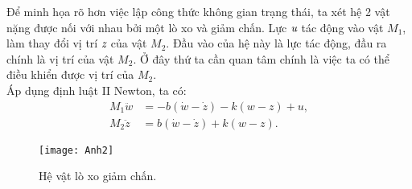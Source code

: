 \begin{example}
Để minh họa rõ hơn việc lập công thức không gian trạng thái, ta xét hệ 2 vật nặng được nối với nhau bởi một lò xo và giảm chấn. Lực $\emph{u}$ tác động vào vật $M_1$, làm thay đổi vị trí $\emph{z}$ của vật $M_2$. Đầu vào của hệ này là lực tác động, đầu ra chính là vị trí của vật $M_2$. Ở đây thứ ta cần quan tâm chính là việc ta có thể điều khiển được vị trí của $M_2$.\\
Áp dụng định luật II Newton, ta có:
\begin{align}
    M_1\ddot{w} &= -b(\dot{w} - \dot{z}) - k(w - z) + u, \\
    M_2\ddot{z} &= b(\dot{w} - \dot{z}) + k(w - z).
\end{align}

\begin{figure}[htp]
\centering
  \texttt{[image: Anh2]}
  \caption{Hệ vật lò xo giảm chấn.}
  \label{fig:pic2}
\end{figure}


\end{example}
